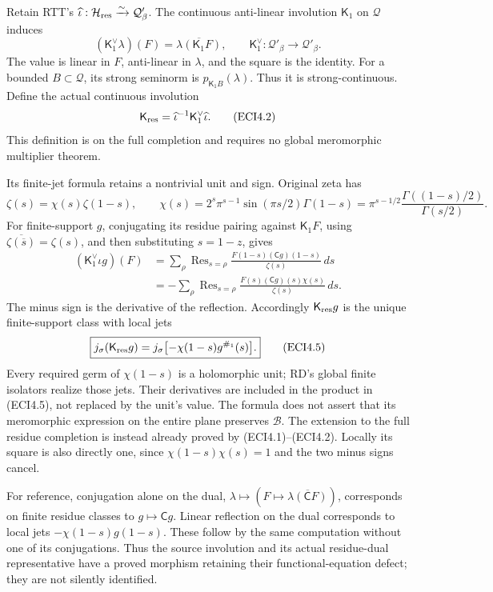 Retain RTT's
\(\widehat\iota:\mathcal H_{\rm res}\xrightarrow{\sim}\mathcal Q'_\beta\).
The continuous anti-linear involution \(\mathsf K_1\) on \(\mathcal Q\)
induces \[
(\mathsf K_1^\vee\lambda)(F)=\overline{\lambda(\mathsf K_1F)},
\qquad\mathsf K_1^\vee:\mathcal Q'_\beta\to\mathcal Q'_\beta.
\tag{ECI4.1}
\] The value is linear in \(F\), anti-linear in \(\lambda\), and the
square is the identity. For a bounded \(B\subset\mathcal Q\), its strong
seminorm is \(p_{\mathsf K_1B}(\lambda)\). Thus it is strong-continuous.
Define the actual continuous involution \[
\mathsf K_{\rm res}=\widehat\iota^{-1}\mathsf K_1^\vee\widehat\iota.
\tag{ECI4.2}
\] This definition is on the full completion and requires no global
meromorphic multiplier theorem.

Its finite-jet formula retains a nontrivial unit and sign. Original zeta
has \[
\zeta(s)=\chi(s)\zeta(1-s),\qquad
\chi(s)=2^s\pi^{s-1}\sin(\pi s/2)\Gamma(1-s)
=\pi^{s-1/2}\frac{\Gamma((1-s)/2)}{\Gamma(s/2)}.
\tag{ECI4.3}
\] For finite-support \(g\), conjugating its residue pairing against
\(\mathsf K_1F\), using \(\overline{\zeta(\overline s)}=\zeta(s)\), and
then substituting \(s=1-z\), gives \[
\begin{aligned}
(\mathsf K_1^\vee\iota g)(F)
&=\sum_\rho\operatorname{Res}_{s=\rho}
\frac{F(1-s)(\mathsf Cg)(1-s)}{\zeta(s)}\,ds\\
&=-\sum_\rho\operatorname{Res}_{s=\rho}
\frac{F(s)(\mathsf Cg)(s)\chi(s)}{\zeta(s)}\,ds.
\end{aligned}
\tag{ECI4.4}
\] The minus sign is the derivative of the reflection. Accordingly
\(\mathsf K_{\rm res}g\) is the unique finite-support class with local
jets \[
\boxed{j_\sigma(\mathsf K_{\rm res}g)
=j_\sigma\bigl[-\chi(1-s)g^{\#_1}(s)\bigr].}
\tag{ECI4.5}
\] Every required germ of \(\chi(1-s)\) is a holomorphic unit; RD's
global finite isolators realize those jets. Their derivatives are
included in the product in (ECI4.5), not replaced by the unit's value.
The formula does not assert that its meromorphic expression on the
entire plane preserves \(\mathcal B\). The extension to the full residue
completion is instead already proved by (ECI4.1)--(ECI4.2). Locally its
square is also directly one, since \(\chi(1-s)\chi(s)=1\) and the two
minus signs cancel.

For reference, conjugation alone on the dual,
\(\lambda\mapsto(F\mapsto\overline{\lambda(\mathsf CF)})\), corresponds
on finite residue classes to \(g\mapsto\mathsf Cg\). Linear reflection
on the dual corresponds to local jets \(-\chi(1-s)g(1-s)\). These follow
by the same computation without one of its conjugations. Thus the source
involution and its actual residue-dual representative have a proved
morphism retaining their functional-equation defect; they are not
silently identified.


